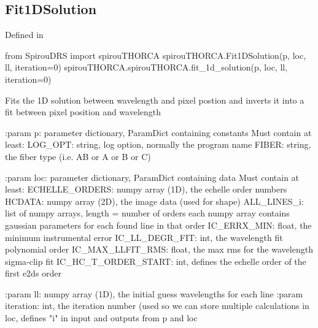 \noindent\begin{minipage}{\textwidth}
\subsection{Fit1DSolution}

Defined in \spirouTHORCA{}

\begin{pythonbox}
from SpirouDRS import spirouTHORCA
spirouTHORCA.Fit1DSolution(p, loc, ll, iteration=0)
spirouTHORCA.spirouTHORCA.fit_1d_solution(p, loc, ll, iteration=0)
\end{pythonbox}

\begin{pythondocstring}
Fits the 1D solution between wavelength and pixel postion and inverts it
into a fit between pixel position and wavelength

:param p: parameter dictionary, ParamDict containing constants
    Must contain at least:
        LOG_OPT: string, log option, normally the program name
        FIBER: string, the fiber type (i.e. AB or A or B or C)

:param loc: parameter dictionary, ParamDict containing data
    Must contain at least:
        ECHELLE_ORDERS: numpy array (1D), the echelle order numbers
        HCDATA: numpy array (2D), the image data (used for shape)
        ALL_LINES_i: list of numpy arrays, length = number of orders
                     each numpy array contains gaussian parameters
                     for each found line in that order
        IC_ERRX_MIN: float, the minimum instrumental error
        IC_LL_DEGR_FIT: int, the wavelength fit polynomial order
        IC_MAX_LLFIT_RMS: float, the max rms for the wavelength
                          sigma-clip fit
        IC_HC_T_ORDER_START: int, defines the echelle order of
                            the first e2ds order

:param ll: numpy array (1D), the initial guess wavelengths for each line
:param iteration: int, the iteration number (used so we can store multiple
                  calculations in loc, defines "i" in input and outputs
                  from p and loc


\end{pythondocstring}
\end{minipage}
